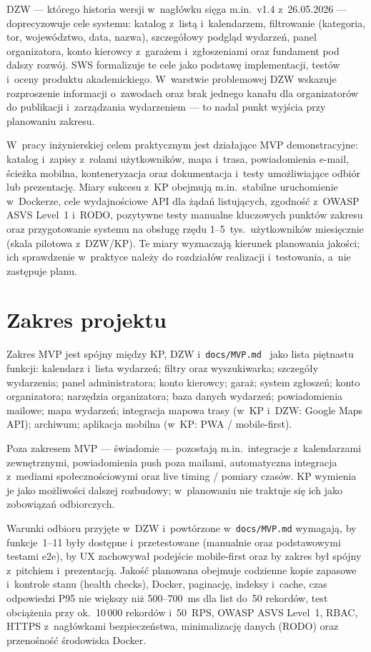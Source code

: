 \documentclass{sprz}
\begin{document}
DZW --- którego historia wersji w~nagłówku sięga m.in.\ v1.4 z~26.05.2026 --- doprecyzowuje cele systemu: katalog z~listą i~kalendarzem, filtrowanie (kategoria, tor, województwo, data, nazwa), szczegółowy podgląd wydarzeń, panel organizatora, konto kierowcy z~garażem i~zgłoszeniami oraz fundament pod dalszy rozwój. SWS formalizuje te cele jako podstawę implementacji, testów i~oceny produktu akademickiego. W~warstwie problemowej DZW wskazuje rozproszenie informacji o~zawodach oraz brak jednego kanału dla organizatorów do publikacji i~zarządzania wydarzeniem --- to nadal punkt wyjścia przy planowaniu zakresu.

W~pracy inżynierskiej celem praktycznym jest działające MVP demonstracyjne: katalog i~zapisy z~rolami użytkowników, mapa i~trasa, powiadomienia e-mail, ścieżka mobilna, konteneryzacja oraz dokumentacja i~testy umożliwiające odbiór lub prezentację. Miary sukcesu z~KP obejmują m.in.\ stabilne uruchomienie w~Dockerze, cele wydajnościowe API dla żądań listujących, zgodność z~OWASP ASVS Level~1 i~RODO, pozytywne testy manualne kluczowych punktów zakresu oraz przygotowanie systemu na obsługę rzędu 1--5~tys.\ użytkowników miesięcznie (skala pilotowa z~DZW/KP). Te miary wyznaczają kierunek planowania jakości; ich sprawdzenie w~praktyce należy do rozdziałów realizacji i~testowania, a~nie zastępuje planu.

\section{Zakres projektu}

Zakres MVP jest spójny między KP, DZW i~\texttt{docs/\allowbreak MVP.md}~\cite{raceportal:mvp} jako lista piętnastu funkcji: kalendarz i~lista wydarzeń; filtry oraz wyszukiwarka; szczegóły wydarzenia; panel administratora; konto kierowcy; garaż; system zgłoszeń; konto organizatora; narzędzia organizatora; baza danych wydarzeń; powiadomienia mailowe; mapa wydarzeń; integracja mapowa trasy (w~KP i~DZW: Google Maps API); archiwum; aplikacja mobilna (w~KP: PWA / mobile-first).

Poza zakresem MVP --- świadomie --- pozostają m.in.\ integracje z~kalendarzami zewnętrznymi, powiadomienia push poza mailami, automatyczna integracja z~mediami społecznościowymi oraz live timing / pomiary czasów. KP wymienia je jako możliwości dalszej rozbudowy; w~planowaniu nie traktuje się ich jako zobowiązań odbiorczych.

Warunki odbioru przyjęte w~DZW i~powtórzone w~\texttt{docs/\allowbreak MVP.md} wymagają, by funkcje~1--11 były dostępne i~przetestowane (manualnie oraz podstawowymi testami e2e), by UX zachowywał podejście mobile-first oraz by zakres był spójny z~pitchiem i~prezentacją. Jakość planowana obejmuje codzienne kopie zapasowe i~kontrole stanu (health checks), Docker, paginację, indeksy i~cache, czas odpowiedzi P95 nie większy niż 500--700~ms dla list do~50 rekordów, test obciążenia przy ok.\ 10\,000 rekordów i~50~RPS, OWASP ASVS Level~1, RBAC, HTTPS z~nagłówkami bezpieczeństwa, minimalizację danych (RODO) oraz przenośność środowiska Docker.
\end{document}
